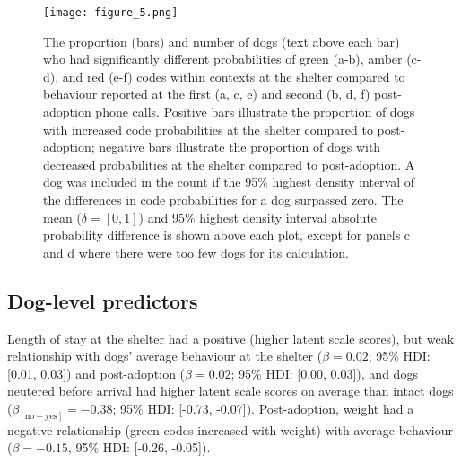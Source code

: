 \documentclass[12pt]{article}
\begin{document}
\begin{figure}[t!]
  \centering
  \texttt{[image: figure\_5.png]}
  \caption{The proportion (bars) and number of dogs (text above each bar) who had significantly different probabilities of green (a-b), amber (c-d), and red (e-f) codes within contexts at the shelter compared to behaviour reported at the first (a, c, e) and second (b, d, f) post-adoption phone calls. Positive bars illustrate the proportion of dogs with increased code probabilities at the shelter compared to post-adoption; negative bars illustrate the proportion of dogs with decreased probabilities at the shelter compared to post-adoption. A dog was included in the count if the 95\% highest density interval of the differences in code probabilities for a dog surpassed zero. The mean ($\delta = [0,1]$) and 95\% highest density interval absolute probability difference is shown above each plot, except for panels c and d where there were too few dogs for its calculation.}
  \label{fig_num_dogs}
\end{figure}

\subsection{Dog-level predictors}
Length of stay at the shelter had a positive (higher latent scale scores), but weak relationship with dogs' average behaviour at the shelter ($\beta = 0.02$; 95\% HDI: [0.01, 0.03]) and post-adoption ($\beta = 0.02$; 95\% HDI: [0.00, 0.03]), and dogs neutered before arrival had higher latent scale scores on average than intact dogs ($\beta_{[\text{no}-\text{yes}]} = -0.38$; 95\% HDI: [-0.73, -0.07]). Post-adoption, weight had a negative relationship (green codes increased with weight) with average behaviour ($\beta = -0.15$, 95\% HDI: [-0.26, -0.05]).
\end{document}
